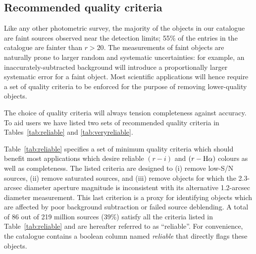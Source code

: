 \documentclass[useAMS,usenatbib]{mn2e}
\def\ha{\mbox{H$\rm \alpha$}}
\begin{document}
\subsection{Recommended quality criteria}
\label{sec:qualitycriteria}

Like any other photometric survey,
the majority of the objects in our catalogue
are faint sources observed near the detection limits;
55\% of the entries in the catalogue
are fainter than $r > 20$.
The measurements of faint objects
are naturally prone to larger
random and systematic uncertainties:
for example, an inaccurately-subtracted background
will introduce a proportionally larger systematic error
for a faint object.
Most scientific applications will hence require a set of
quality criteria to be enforced for the purpose
of removing lower-quality objects.

The choice of quality criteria will always tension 
completeness against accuracy.
To aid users we have listed two sets of
recommended quality criteria 
in Tables~\ref{tab:reliable} and \ref{tab:veryreliable}.

Table~\ref{tab:reliable} specifies
a set of minimum quality criteria
which should benefit most applications
which desire reliable $(r-i)$ and $(r-\ha)$ colours
as well as completeness.
The listed criteria are designed to 
(i) remove low-S/N sources, 
(ii) remove saturated sources,
and (iii) remove objects for which the 2.3-arcsec diameter
aperture magnitude is inconsistent 
with its alternative 1.2-arcsec diameter measurement.
This last criterion is a proxy
for identifying objects which are affected
by poor background subtraction
or failed source deblending.
A total of 86 out of 219 million sources 
(39\%) satisfy all the criteria listed in Table~\ref{tab:reliable}
and are hereafter referred to as ``reliable''.
For convenience, the catalogue contains a boolean column
named \emph{reliable} that directly flags these objects.
\end{document}
